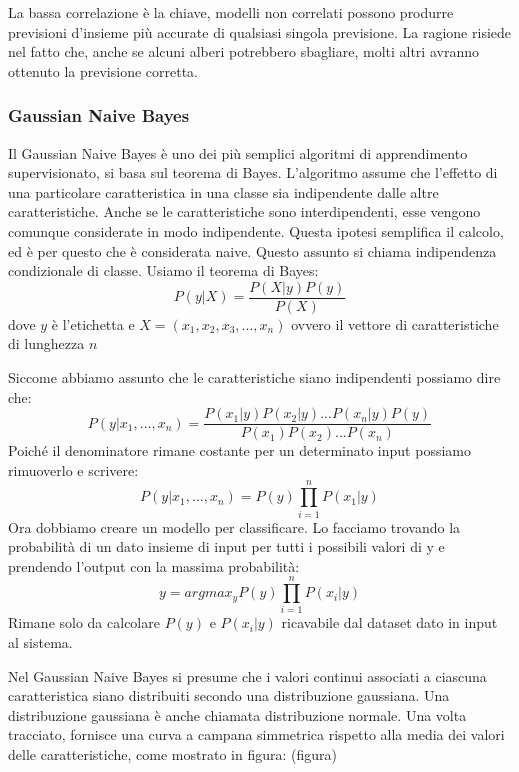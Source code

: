 \documentclass[12pt,italian]{report}
\begin{document}
La bassa correlazione è la chiave, modelli non correlati possono produrre previsioni d'insieme più accurate di qualsiasi singola previsione. La ragione risiede nel fatto che, anche se alcuni alberi potrebbero sbagliare, molti altri avranno ottenuto la previsione corretta.
\subsubsection{Gaussian Naive Bayes}
Il Gaussian Naive Bayes è uno dei più semplici algoritmi di apprendimento supervisionato, si basa sul teorema di Bayes. L'algoritmo assume che l'effetto di una particolare caratteristica in una classe sia indipendente dalle altre caratteristiche. Anche se le caratteristiche sono interdipendenti, esse vengono comunque considerate in modo indipendente. Questa ipotesi semplifica il calcolo, ed è per questo che è considerata naive. Questo assunto si chiama indipendenza condizionale di classe.
Usiamo il teorema di Bayes:
\begin{equation}
P(y | X) = \frac{P(X | y) P(y)}{P(X)}
\end{equation}
dove $y$ è l'etichetta e $X = (x_1, x_2, x_3, ..., x_n)$ ovvero il vettore di caratteristiche di lunghezza $n$

Siccome abbiamo assunto che le caratteristiche siano indipendenti possiamo dire che:
\begin{equation}
P(y| x_1,..., x_n) = \frac{P(x_1|y) P(x_2|y)...P(x_n|y)P(y)}{P(x_1)P(x_2)...P(x_n)}
\end{equation}
Poiché il denominatore rimane costante per un determinato input possiamo rimuoverlo e scrivere:
\begin{equation}
P(y| x_1,..., x_n) = P(y) \prod_{i=1}^{n} P(x_1|y)
\end{equation}
Ora dobbiamo creare un modello per classificare. Lo facciamo trovando la probabilità di un dato insieme di input per tutti i possibili valori di y e prendendo l'output con la massima probabilità:
\begin{equation}
y = argmax_y P(y) \prod_{i=1}^{n} P(x_i|y)
\end{equation}
Rimane solo da calcolare $P(y)$ e $P(x_i|y)$ ricavabile dal dataset dato in input al sistema.

Nel Gaussian Naive Bayes si presume che i valori continui associati a ciascuna caratteristica siano distribuiti secondo una distribuzione gaussiana. Una distribuzione gaussiana è anche chiamata distribuzione normale. Una volta tracciato, fornisce una curva a campana simmetrica rispetto alla media dei valori delle caratteristiche, come mostrato in figura: (figura)
\end{document}
